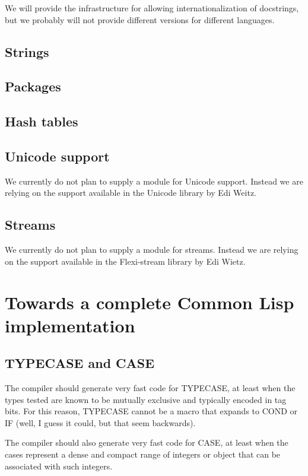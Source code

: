 \documentclass{article}
\begin{document}
We will provide the infrastructure for allowing internationalization
of docstrings, but we probably will not provide different versions for
different languages. 

\subsection{Strings}

\subsection{Packages}

\subsection{Hash tables}

\subsection{Unicode support}

We currently do not plan to supply a module for Unicode support.
Instead we are relying on the support available in the Unicode library
by Edi Weitz.

\subsection{Streams}

We currently do not plan to supply a module for streams.  Instead we
are relying on the support available in the Flexi-stream library by
Edi Wietz.

\section{Towards a complete Common Lisp implementation}

\subsection{TYPECASE and CASE}

The compiler should generate very fast code for TYPECASE, at least
when the types tested are known to be mutually exclusive and typically
encoded in tag bits.  For this reason, TYPECASE cannot be a macro that
expands to COND or IF (well, I guess it could, but that seem backwards).

The compiler should also generate very fast code for CASE, at least
when the cases represent a dense and compact range of integers or
object that can be associated with such integers.
\end{document}
